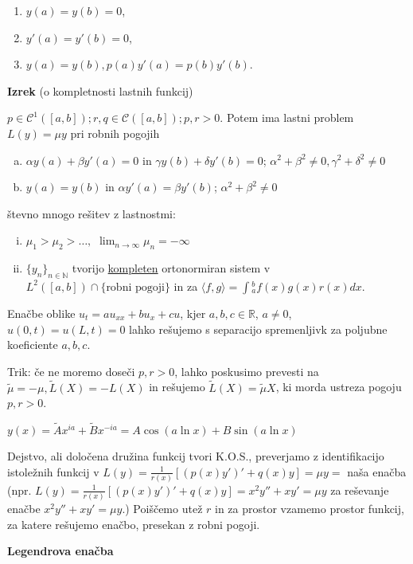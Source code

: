 \documentclass[11pt,a4paper]{amsart}
\theoremstyle{definition} %
\theoremstyle{plain} %
\let\oldint\int
\renewcommand{\int}{\oldint \!}
\newcommand{\R}{\mathbb R}
\newcommand{\N}{\mathbb N}
\begin{document}
\begin{enumerate}
\item $y(a)=y(b)=0$,
\item $y'(a)=y'(b)=0$,
\item $y(a)=y(b), p(a)y'(a)=p(b)y'(b)$.
\end{enumerate}

\textbf{Izrek} (o kompletnosti lastnih funkcij)

$p \in \mathcal{C}^1([a,b]); r,q \in \mathcal{C}([a,b]); p,r > 0$. Potem ima lastni problem $L(y) = \mu y$ pri robnih pogojih
\vspace{-0.1cm}
\begin{enumerate}[a)]
\item $\alpha y(a) + \beta y'(a) = 0$ in $\gamma y(b) +  \delta y'(b) = 0$; $\alpha^2 + \beta^2 \neq 0, \gamma^2 + \delta^2 \neq 0$
\item $y(a) = y(b)$ in $\alpha y'(a) = \beta y'(b)$; $\alpha^2+\beta^2 \neq 0$
\end{enumerate}
števno mnogo rešitev z lastnostmi:
\begin{enumerate}[i)]
\item $\mu_1 > \mu_2 > \ldots, $ $\lim_{n\rightarrow \infty}\mu_n = -\infty$
\item $\{y_n\}_{n\in \N}$ tvorijo \underline{kompleten} ortonormiran sistem v $L^2([a,b])\cap \{\text{robni pogoji}\}$ in za $ \langle f,g \rangle = \int_a^b f(x)g(x)r(x)dx$.
\end{enumerate}

Enačbe oblike $u_t = au_{xx} + bu_x + cu$, kjer $a,b,c \in \R$, $a\neq 0$, $u(0,t) = u(L,t) = 0$ lahko rešujemo s separacijo spremenljivk za poljubne koeficiente $a,b,c$.

Trik: če ne moremo doseči $p, r > 0$, lahko poskusimo prevesti na $\tilde{\mu} = -\mu, \tilde{L}(X) = -L(X)$ in rešujemo $\tilde{L}(X) = \tilde{\mu}X$, ki morda ustreza pogoju $p, r > 0$.

$y(x) = \tilde{A}x^{ia} + \tilde{B}x^{-ia} = A\cos{(a\ln{x})} + B\sin{(a\ln{x})}$

Dejstvo, ali določena družina funkcij tvori K.O.S., preverjamo z identifikacijo istoležnih funkcij v $L(y) = \frac{1}{r(x)}[(p(x)y')'+q(x)y] = \mu y =$ naša enačba (npr.  $L(y) = \frac{1}{r(x)}[(p(x)y')'+q(x)y] = x^2y'' + xy' = \mu y$ za reševanje enačbe $ x^2y'' + xy' = \mu y$.) Poiščemo utež $r$ in za prostor vzamemo prostor funkcij, za katere rešujemo enačbo, presekan z robni pogoji.

\textbf{Legendrova enačba}
\end{document}
